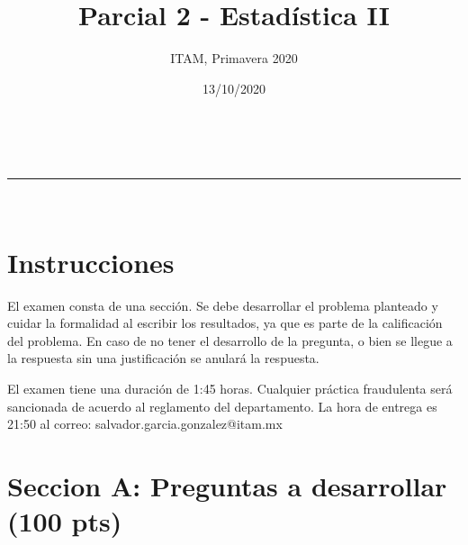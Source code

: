 \documentclass[addpoints]{exam}
\makeatletter
\newcommand{\linia}{\rule{\linewidth}{0.5pt}}
\theoremstyle{mytheor}
\renewcommand{\maketitle}{
    \begin{center}
    \vspace{2ex}
    {\huge \textsc{\@title}}
    \vspace{1ex}
    \\
    \linia\\
    \@author \hfill \@date
    \vspace{4ex}
    \end{center}
  }
\makeatother
\begin{document}
  
  \title{Parcial 2 - Estadística II}
  
  \author{ITAM, Primavera 2020}
  
  \date{13/10/2020}
  
  \maketitle
  
  \section*{Instrucciones}
  
 El examen consta de una sección. Se debe desarrollar el problema planteado y cuidar la formalidad al escribir los resultados, ya que es parte de la calificación del problema. En caso de no tener el desarrollo de la pregunta, o bien se llegue a la respuesta sin una justificación se anulará la respuesta. 
  
  \vspace{10pt}
  
El examen tiene una duración de 1:45 horas. Cualquier práctica fraudulenta será sancionada de acuerdo al reglamento del departamento. La hora de entrega es 21:50 al correo: salvador.garcia.gonzalez@itam.mx

  \section*{Seccion A: Preguntas a desarrollar (100 pts)}
  
\end{document}
